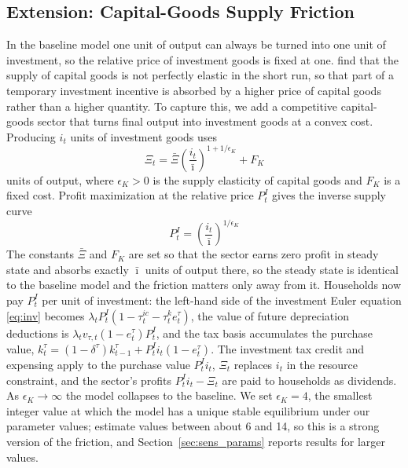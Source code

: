 \documentclass[article,11pt,letterpaper,fleqn]{article}
\theoremstyle{definition}
\numberwithin{equation}{section}
\begin{document}
\subsection{Extension: Capital-Goods Supply Friction}
\label{sec:kgoods}

In the baseline model one unit of output can always be turned into one unit of investment, so the relative price of investment goods is fixed at one. \citet{House_Shapiro_2008} find that the supply of capital goods is not perfectly elastic in the short run, so that part of a temporary investment incentive is absorbed by a higher price of capital goods rather than a higher quantity. To capture this, we add a competitive capital-goods sector that turns final output into investment goods at a convex cost. Producing $i_t$ units of investment goods uses
\begin{equation}\label{eq:kg_cost}
\Xi_t = \bar{\Xi}\left(\frac{i_t}{\bar{\imath}}\right)^{1+1/\epsilon_K} + F_K
\end{equation}
units of output, where $\epsilon_K > 0$ is the supply elasticity of capital goods and $F_K$ is a fixed cost. Profit maximization at the relative price $P^I_t$ gives the inverse supply curve
\begin{equation}\label{eq:kg_price}
P^I_t = \left(\frac{i_t}{\bar{\imath}}\right)^{1/\epsilon_K}
\end{equation}
The constants $\bar{\Xi}$ and $F_K$ are set so that the sector earns zero profit in steady state and absorbs exactly $\bar{\imath}$ units of output there, so the steady state is identical to the baseline model and the friction matters only away from it. Households now pay $P^I_t$ per unit of investment: the left-hand side of the investment Euler equation \eqref{eq:inv} becomes $\lambda_t P^I_t(1-\tau_t^{ic}-\tau_t^k e_t^{\tau})$, the value of future depreciation deductions is $\lambda_t v_{\tau,t}(1-e_t^{\tau})P^I_t$, and the tax basis accumulates the purchase value, $k_t^{\tau} = (1-\delta^{\tau})k_{t-1}^{\tau} + P^I_t i_t (1-e_t^{\tau})$. The investment tax credit and expensing apply to the purchase value $P^I_t i_t$, $\Xi_t$ replaces $i_t$ in the resource constraint, and the sector's profits $P^I_t i_t - \Xi_t$ are paid to households as dividends. As $\epsilon_K \to \infty$ the model collapses to the baseline. We set $\epsilon_K = 4$, the smallest integer value at which the model has a unique stable equilibrium under our parameter values; \citet{House_Shapiro_2008} estimate values between about 6 and 14, so this is a strong version of the friction, and Section~\ref{sec:sens_params} reports results for larger values.
\end{document}
